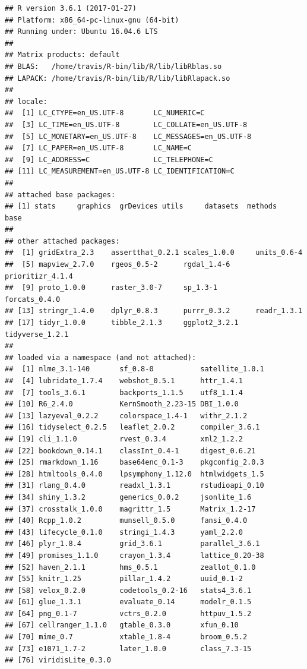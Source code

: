 \documentclass[12pt,]{book}
\begin{document}
\begin{verbatim}
## R version 3.6.1 (2017-01-27)
## Platform: x86_64-pc-linux-gnu (64-bit)
## Running under: Ubuntu 16.04.6 LTS
## 
## Matrix products: default
## BLAS:   /home/travis/R-bin/lib/R/lib/libRblas.so
## LAPACK: /home/travis/R-bin/lib/R/lib/libRlapack.so
## 
## locale:
##  [1] LC_CTYPE=en_US.UTF-8       LC_NUMERIC=C              
##  [3] LC_TIME=en_US.UTF-8        LC_COLLATE=en_US.UTF-8    
##  [5] LC_MONETARY=en_US.UTF-8    LC_MESSAGES=en_US.UTF-8   
##  [7] LC_PAPER=en_US.UTF-8       LC_NAME=C                 
##  [9] LC_ADDRESS=C               LC_TELEPHONE=C            
## [11] LC_MEASUREMENT=en_US.UTF-8 LC_IDENTIFICATION=C       
## 
## attached base packages:
## [1] stats     graphics  grDevices utils     datasets  methods   base     
## 
## other attached packages:
##  [1] gridExtra_2.3    assertthat_0.2.1 scales_1.0.0     units_0.6-4     
##  [5] mapview_2.7.0    rgeos_0.5-2      rgdal_1.4-6      prioritizr_4.1.4
##  [9] proto_1.0.0      raster_3.0-7     sp_1.3-1         forcats_0.4.0   
## [13] stringr_1.4.0    dplyr_0.8.3      purrr_0.3.2      readr_1.3.1     
## [17] tidyr_1.0.0      tibble_2.1.3     ggplot2_3.2.1    tidyverse_1.2.1 
## 
## loaded via a namespace (and not attached):
##  [1] nlme_3.1-140       sf_0.8-0           satellite_1.0.1   
##  [4] lubridate_1.7.4    webshot_0.5.1      httr_1.4.1        
##  [7] tools_3.6.1        backports_1.1.5    utf8_1.1.4        
## [10] R6_2.4.0           KernSmooth_2.23-15 DBI_1.0.0         
## [13] lazyeval_0.2.2     colorspace_1.4-1   withr_2.1.2       
## [16] tidyselect_0.2.5   leaflet_2.0.2      compiler_3.6.1    
## [19] cli_1.1.0          rvest_0.3.4        xml2_1.2.2        
## [22] bookdown_0.14.1    classInt_0.4-1     digest_0.6.21     
## [25] rmarkdown_1.16     base64enc_0.1-3    pkgconfig_2.0.3   
## [28] htmltools_0.4.0    lpsymphony_1.12.0  htmlwidgets_1.5   
## [31] rlang_0.4.0        readxl_1.3.1       rstudioapi_0.10   
## [34] shiny_1.3.2        generics_0.0.2     jsonlite_1.6      
## [37] crosstalk_1.0.0    magrittr_1.5       Matrix_1.2-17     
## [40] Rcpp_1.0.2         munsell_0.5.0      fansi_0.4.0       
## [43] lifecycle_0.1.0    stringi_1.4.3      yaml_2.2.0        
## [46] plyr_1.8.4         grid_3.6.1         parallel_3.6.1    
## [49] promises_1.1.0     crayon_1.3.4       lattice_0.20-38   
## [52] haven_2.1.1        hms_0.5.1          zeallot_0.1.0     
## [55] knitr_1.25         pillar_1.4.2       uuid_0.1-2        
## [58] velox_0.2.0        codetools_0.2-16   stats4_3.6.1      
## [61] glue_1.3.1         evaluate_0.14      modelr_0.1.5      
## [64] png_0.1-7          vctrs_0.2.0        httpuv_1.5.2      
## [67] cellranger_1.1.0   gtable_0.3.0       xfun_0.10         
## [70] mime_0.7           xtable_1.8-4       broom_0.5.2       
## [73] e1071_1.7-2        later_1.0.0        class_7.3-15      
## [76] viridisLite_0.3.0
\end{verbatim}


\end{document}
